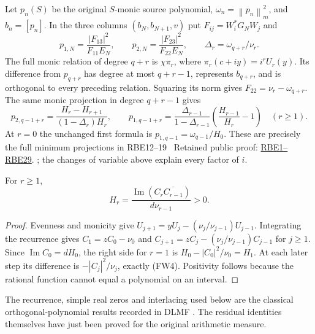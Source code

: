 \documentclass[11pt]{article}
\newcommand{\norm}[1]{\left\lVert#1\right\rVert}
\begin{document}
Let $p_n(S)$ be the original $S$-monic source polynomial,
$\omega_n=\norm{p_n}_m^2$, and $b_n=[p_n]$. In the three columns
$(b_N,b_{N+1},v)$ put $F_{ij}=W_i^*G_NW_j$ and
\[
 p_{1,N}=\frac{|F_{13}|^2}{F_{11}E_N},\qquad
 p_{2,N}=\frac{|F_{23}|^2}{F_{22}E_N},\qquad
 \Delta_r=\omega_{q+r}/\nu_r.
\]
The full monic relation of degree $q+r$ is $\chi\pi_r$, where
$\pi_r(c+iy)=i^rU_r(y)$. Its difference from $p_{q+r}$ has degree
at most $q+r-1$, represents $b_{q+r}$, and is orthogonal to every
preceding relation. Squaring its norm gives $F_{22}=\nu_r-\omega_{q+r}$.
The same monic projection in degree $q+r-1$ gives
\begin{equation}\tag{FW5}
 p_{2,q-1+r}=\frac{H_r-H_{r+1}}{(1-\Delta_r)H_r},\qquad
 p_{1,q-1+r}=\frac{\Delta_{r-1}}{1-\Delta_{r-1}}
                  \left(\frac{H_{r-1}}{H_r}-1\right)\quad(r\ge1).
\end{equation}
At $r=0$ the unchanged first formula is $p_{1,q-1}=\omega_{q-1}/H_0$.
These are precisely the full minimum projections in RBE12--19
\cite{rbe}%
~Retained public proof: \href{https://github.com/KokunoYumeto/zeta-function-research-reader/blob/689a8f87e9c12b7a99b01b3123438c6751ee608f/workbenches/splitzero-tandem/continuations/20260919-full-window-source-products/providers/RETAINED_CLASS_BOUNDARY_ENERGIES.tex\#L45}{RBE1--RBE29}.%
{}; the changes of variable above explain every factor of $i$.

\begin{lemma}
For $r\ge1$,
\begin{equation}\tag{FW6}
 H_r=\frac{\operatorname{Im}(C_r\overline{C_{r-1}})}{d\nu_{r-1}}>0.
\end{equation}
\end{lemma}
\begin{proof}
Evenness and monicity give $U_{j+1}=yU_j-(\nu_j/\nu_{j-1})U_{j-1}$.
Integrating the recurrence gives $C_1=zC_0-\nu_0$ and
$C_{j+1}=zC_j-(\nu_j/\nu_{j-1})C_{j-1}$ for $j\ge1$.
Since $\operatorname{Im}C_0=dH_0$, the right side for $r=1$ is
$H_0-|C_0|^2/\nu_0=H_1$. At each later step its difference is
$-|C_j|^2/\nu_j$, exactly (FW4). Positivity follows because the
rational function cannot equal a polynomial on an interval.
\end{proof}
The recurrence, simple real zeros and interlacing used below are the
classical orthogonal-polynomial results recorded in DLMF
\cite[\S18.2(iv), (vi), (vii)]{DLMF}. The residual identities themselves
have just been proved for the original arithmetic measure.
\end{document}
